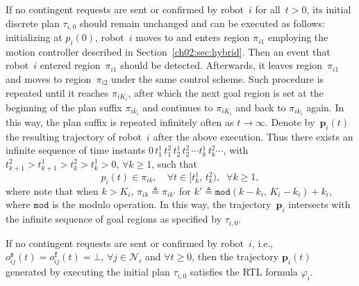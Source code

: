 If no contingent requests are sent or confirmed by robot~$i$ for all~$t>0$, its initial discrete plan $\tau_{i,0}$ should remain unchanged and can be executed as follows: initializing at $p_i(0)$, robot~$i$ moves to and enters region $\pi_{i1}$ employing the motion controller described in Section~\ref{ch02:sec:hybrid}.
Then an event that robot~$i$ entered region~$\pi_{i1}$ should be detected.
Afterwards, it leaves region~$\pi_{i1}$ and moves to region~$\pi_{i2}$ under the same control scheme. Such procedure is repeated until it reaches $\pi_{iK_i}$, after which the next goal region is set at the beginning of the plan suffix $\pi_{ik_i}$ and continues to $\pi_{iK_i}$ and back to $\pi_{ik_i}$ again.
In this way, the plan suffix is repeated infinitely often as $t\rightarrow \infty$.
Denote by~$\mathbf{p}_i(t)$ the resulting trajectory of robot~$i$ after the above execution.
Thus there exists an infinite sequence of time instants $0\,t_{1}^1\,t_{1}^2\,t_2^1\,t_2^2\,\cdots t_k^1\,t_k^2\cdots$, with $t_{k+1}^2>t_{k+1}^1>t_{k}^2>t_k^1>0$, $\forall k\geq 1$, such that
\begin{equation}\label{ch03:eq:traj}
p_i(t) \in \pi_{ik}, \quad \forall t \in [t_k^1,\,t_{k}^2), \;\; \forall k\geq 1,
\end{equation}
where note that when $k>K_i$, $\pi_{ik}\triangleq\pi_{ik'}$ for $k'\triangleq\texttt{mod}(k-k_i,\,K_i-k_i)+k_i$, where $\texttt{mod}$ is the modulo operation.
In this way, the trajectory~$\mathbf{p}_i$ intersects with the infinite sequence of goal regions as specified by $\tau_{i,0}$.
\begin{theorem}\label{ch03:theo:satisfy}
If no contingent requests are sent or confirmed by robot~$i$, i.e., $o^\texttt{s}_{ij}(t)=o^\texttt{f}_{ij}(t)=\bot$, $\forall j\in \mathcal{N}_i$ and $\forall t\geq 0$, then the trajectory $\mathbf{p}_i(t)$ generated by executing the initial plan $\tau_{i,0}$ satisfies the RTL formula $\varphi_i$.
\end{theorem}
